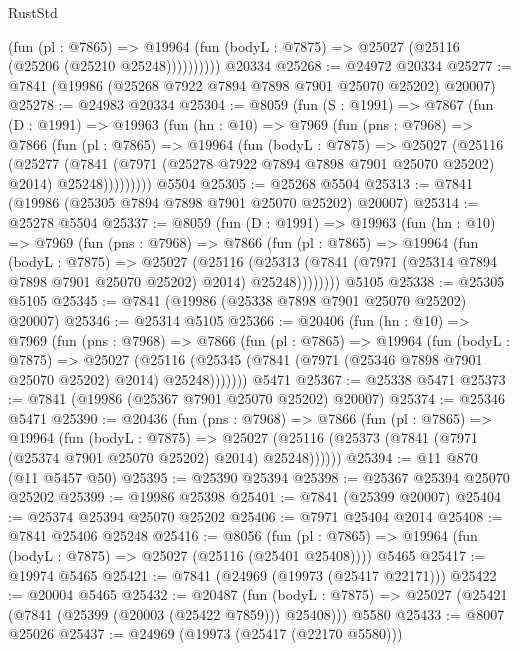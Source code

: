 \begin{lexlean}{RustStd}
\begin{coremodule}
              (fun (pl : @7865) =>
              @19964 (fun (bodyL : @7875) => @25027 (@25116 (@25206 (@25210 @25248))))))))))
    @20334
@25268 := @24972 @20334
@25277 := @7841 (@19986 (@25268 @7922 @7894 @7898 @7901 @25070 @25202) @20007)
@25278 := @24983 @20334
@25304 := @8059
    (fun (S : @1991) =>
    @7867
      (fun (D : @1991) =>
      @19963
        (fun (hn : @10) =>
        @7969
          (fun (pns : @7968) =>
          @7866
            (fun (pl : @7865) =>
            @19964
              (fun (bodyL : @7875) =>
              @25027
                (@25116
                  (@25277
                    (@7841
                      (@7971 (@25278 @7922 @7894 @7898 @7901 @25070 @25202) @2014)
                      @25248)))))))))
    @5504
@25305 := @25268 @5504
@25313 := @7841 (@19986 (@25305 @7894 @7898 @7901 @25070 @25202) @20007)
@25314 := @25278 @5504
@25337 := @8059
    (fun (D : @1991) =>
    @19963
      (fun (hn : @10) =>
      @7969
        (fun (pns : @7968) =>
        @7866
          (fun (pl : @7865) =>
          @19964
            (fun (bodyL : @7875) =>
            @25027
              (@25116
                (@25313 (@7841 (@7971 (@25314 @7894 @7898 @7901 @25070 @25202) @2014) @25248))))))))
    @5105
@25338 := @25305 @5105
@25345 := @7841 (@19986 (@25338 @7898 @7901 @25070 @25202) @20007)
@25346 := @25314 @5105
@25366 := @20406
    (fun (hn : @10) =>
    @7969
      (fun (pns : @7968) =>
      @7866
        (fun (pl : @7865) =>
        @19964
          (fun (bodyL : @7875) =>
          @25027
            (@25116 (@25345 (@7841 (@7971 (@25346 @7898 @7901 @25070 @25202) @2014) @25248)))))))
    @5471
@25367 := @25338 @5471
@25373 := @7841 (@19986 (@25367 @7901 @25070 @25202) @20007)
@25374 := @25346 @5471
@25390 := @20436
    (fun (pns : @7968) =>
    @7866
      (fun (pl : @7865) =>
      @19964
        (fun (bodyL : @7875) =>
        @25027 (@25116 (@25373 (@7841 (@7971 (@25374 @7901 @25070 @25202) @2014) @25248))))))
@25394 := @11 @870 (@11 @5457 @50)
@25395 := @25390 @25394
@25398 := @25367 @25394 @25070 @25202
@25399 := @19986 @25398
@25401 := @7841 (@25399 @20007)
@25404 := @25374 @25394 @25070 @25202
@25406 := @7971 @25404 @2014
@25408 := @7841 @25406 @25248
@25416 := @8056
    (fun (pl : @7865) => @19964 (fun (bodyL : @7875) => @25027 (@25116 (@25401 @25408))))
    @5465
@25417 := @19974 @5465
@25421 := @7841 (@24969 (@19973 (@25417 @22171)))
@25422 := @20004 @5465
@25432 := @20487
    (fun (bodyL : @7875) => @25027 (@25421 (@7841 (@25399 (@20003 (@25422 @7859))) @25408)))
    @5580
@25433 := @8007 @25026
@25437 := @24969 (@19973 (@25417 (@22170 @5580)))

\end{coremodule}
\end{lexlean}
